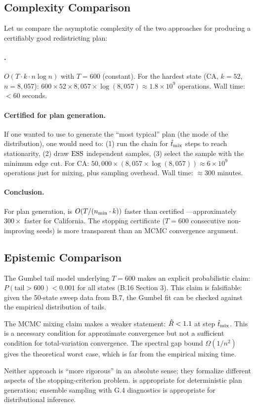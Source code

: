 \subsection{Complexity Comparison}

Let us compare the asymptotic complexity of the two approaches for
producing a certifiably good redistricting plan:

\paragraph{\cs{}.}
$O(T \cdot k \cdot n \log n)$ with $T = 600$ (constant).
For the hardest state (CA, $k = 52$, $n = 8{,}057$):
$600 \times 52 \times 8{,}057 \times \log(8{,}057) \approx 1.8 \times 10^9$ operations.
Wall time: $<$60 seconds.

\paragraph{Certified \recom{} for plan generation.}
If one wanted to use \recom{} to generate the ``most typical'' plan
(the mode of the distribution), one would need to:
(1) run the chain for $\hat{t}_{\rm mix}$ steps to reach stationarity,
(2) draw $\mathrm{ESS}$ independent samples,
(3) select the sample with the minimum edge cut.
For CA: $50{,}000 \times (8{,}057 \times \log(8{,}057)) \approx 6 \times 10^9$ operations
just for mixing, plus sampling overhead.
Wall time: $\approx$300 minutes.

\paragraph{Conclusion.}
For plan generation, \cs{} is $O(T/(n_{\rm min} \cdot k))$ faster than
certified \recom{}---approximately $300\times$ faster for California.
The stopping certificate ($T = 600$ consecutive non-improving seeds) is
more transparent than an MCMC convergence argument.

\subsection{Epistemic Comparison}

The Gumbel tail model underlying $T = 600$ makes an explicit probabilistic
claim: $P(\text{tail} > 600) < 0.001$ for all states (B.16 Section 3).
This claim is falsifiable: given the 50-state sweep data from B.7, the
Gumbel fit can be checked against the empirical distribution of tails.

The MCMC mixing claim makes a weaker statement: $\hat{R} < 1.1$ at step
$\hat{t}_{\rm mix}$.
This is a necessary condition for approximate convergence but not a
sufficient condition for total-variation convergence.
The spectral gap bound $\Omega(1/n^2)$ gives the theoretical worst case,
which is far from the empirical mixing time.

Neither approach is ``more rigorous'' in an absolute sense; they formalize
different aspects of the stopping-criterion problem.
\cs{} is appropriate for deterministic plan generation; ensemble sampling
with G.4 diagnostics is appropriate for distributional inference.
